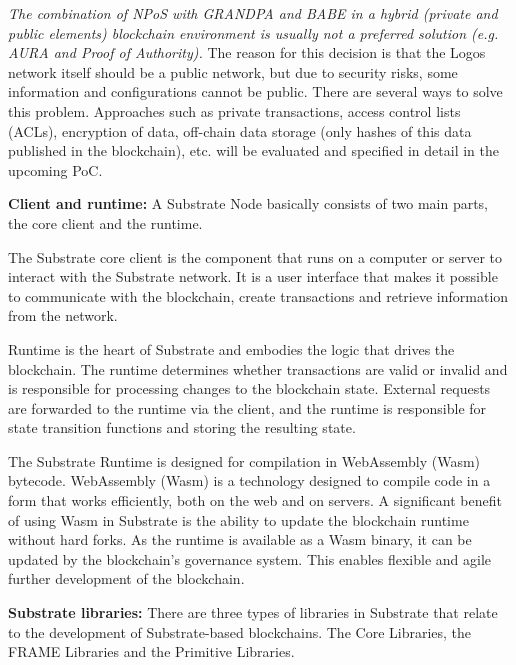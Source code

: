 \documentclass[]{article}
\begin{document}
\textit{The combination of NPoS with GRANDPA and BABE in a hybrid (private and public elements) blockchain environment is usually not a preferred solution (e.g. AURA and Proof of Authority).}
\newline
The reason for this decision is that the Logos network itself should be a public network, but due to security risks, some information and configurations cannot be public.
There are several ways to solve this problem. 
Approaches such as private transactions, access control lists (ACLs), encryption of data, off-chain data storage (only hashes of this data published in the blockchain), etc. will be evaluated and specified in detail in the upcoming PoC.
\newline

\textbf{Client and runtime:}
A Substrate Node basically consists of two main parts, the core client and the runtime.

The Substrate core client is the component that runs on a computer or server to interact with the Substrate network. 
It is a user interface that makes it possible to communicate with the blockchain, create transactions and retrieve information from the network.

Runtime is the heart of Substrate and embodies the logic that drives the blockchain.
The runtime determines whether transactions are valid or invalid and is responsible for processing changes to the blockchain state. 
External requests are forwarded to the runtime via the client, and the runtime is responsible for state transition functions and storing the resulting state.

The Substrate Runtime is designed for compilation in WebAssembly (Wasm) bytecode.
WebAssembly (Wasm) \cite{Webass} is a technology designed to compile code in a form that works efficiently, both on the web and on servers.
A significant benefit of using Wasm in Substrate is the ability to update the blockchain runtime without hard forks. 
As the runtime is available as a Wasm binary, it can be updated by the blockchain's governance system. 
This enables flexible and agile further development of the blockchain.
\newline

\textbf{Substrate libraries:}
There are three types of libraries in Substrate that relate to the development of Substrate-based blockchains.
The Core Libraries, the FRAME Libraries and the Primitive Libraries.  
\end{document}
